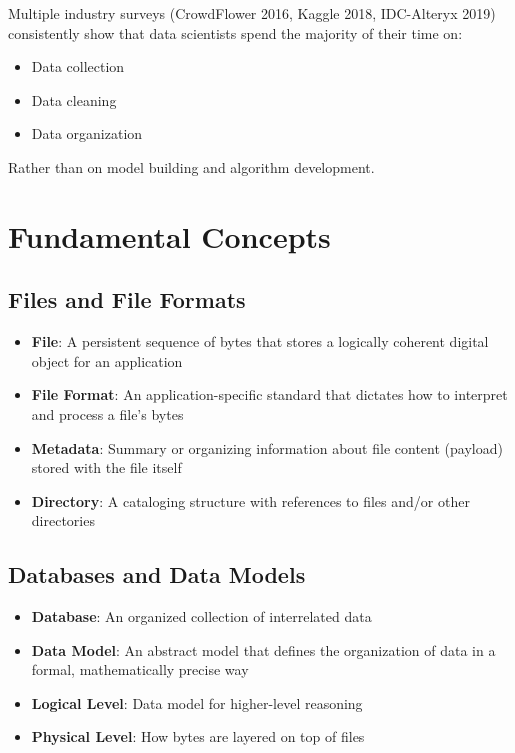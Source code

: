 \documentclass[12pt]{article}
\begin{document}
\begin{tcolorbox}[colback=gray!10!white,colframe=gray!50!black,title=Research Findings]
Multiple industry surveys (CrowdFlower 2016, Kaggle 2018, IDC-Alteryx 2019) consistently show that data scientists spend the majority of their time on:
\begin{itemize}
    \item Data collection
    \item Data cleaning
    \item Data organization
\end{itemize}
Rather than on model building and algorithm development.
\end{tcolorbox}

\section{Fundamental Concepts}

\subsection{Files and File Formats}
\begin{itemize}
    \item \textbf{File}: A persistent sequence of bytes that stores a logically coherent digital object for an application
    \item \textbf{File Format}: An application-specific standard that dictates how to interpret and process a file's bytes
    \item \textbf{Metadata}: Summary or organizing information about file content (payload) stored with the file itself
    \item \textbf{Directory}: A cataloging structure with references to files and/or other directories
\end{itemize}

\subsection{Databases and Data Models}
\begin{itemize}
    \item \textbf{Database}: An organized collection of interrelated data
    \item \textbf{Data Model}: An abstract model that defines the organization of data in a formal, mathematically precise way
    \item \textbf{Logical Level}: Data model for higher-level reasoning
    \item \textbf{Physical Level}: How bytes are layered on top of files
\end{itemize}
\end{document}
